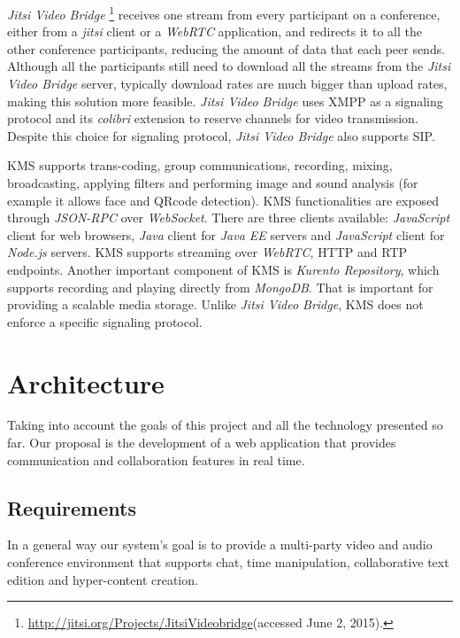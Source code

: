\documentclass[10pt,conference]{IEEEtran}
\begin{document}
	\emph{Jitsi Video Bridge} \footnote{\url{http://jitsi.org/Projects/JitsiVideobridge}(accessed June 2, 2015).} receives one stream from every participant on a conference, either from a \emph{jitsi} client or a \emph{WebRTC} application, and redirects it to all the other conference participants, reducing the amount of data that each peer sends. Although all the participants still need to download all the streams from the \emph{Jitsi Video Bridge} server, typically download rates are much bigger than upload rates, making this solution more feasible.
	\emph{Jitsi Video Bridge} uses \gls{XMPP} as a signaling protocol and its \emph{colibri} extension \cite{xep0340} to reserve channels for video transmission. Despite this choice for signaling protocol, \emph{Jitsi Video Bridge} also supports \gls{SIP}.

	
	  \gls{KMS} supports trans-coding, group communications, recording, mixing, broadcasting, applying filters and performing image and sound analysis (for example it allows face and QRcode detection). \gls{KMS} functionalities are exposed through \emph{JSON-RPC} over \emph{WebSocket}.
          There are three clients available: \emph{JavaScript} client for web browsers, \emph{Java} client for \emph{Java EE} servers and \emph{JavaScript} client for \emph{Node.js} servers. 
	\gls{KMS} supports streaming over \emph{WebRTC}, \gls{HTTP} and \gls{RTP} endpoints. Another important component of \gls{KMS} is \emph{Kurento Repository}, which supports recording and playing directly from \emph{MongoDB}. That is important for providing a scalable media storage. Unlike \emph{Jitsi Video Bridge}, \gls{KMS} does not enforce a specific signaling protocol.
	











\section{Architecture}
\label{chapter:architecture}

Taking into account the goals of this project and all the technology presented so far. Our proposal is the development of a web application that provides communication and collaboration features in real time.

\subsection{Requirements}
\label{chapter:requirements}
In a general way our system's goal is to provide a multi-party video and audio conference environment that supports chat, time manipulation, collaborative text edition and hyper-content creation.
\end{document}
